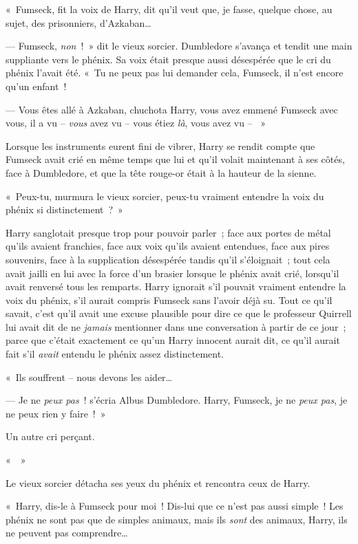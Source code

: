 «~Fumseck, fit la voix de Harry, dit qu'il veut que, je fasse, quelque chose, au sujet, des prisonniers, d'Azkaban…

--- Fumseck, \emph{non}~!~» dit le vieux sorcier. Dumbledore s'avança et tendit une main suppliante vers le phénix. Sa voix était presque aussi désespérée que le cri du phénix l'avait été. «~Tu ne peux pas lui demander cela, Fumseck, il n'est encore qu'un enfant~!

--- Vous êtes allé à Azkaban, chuchota Harry, vous avez emmené Fumseck avec vous, il a vu -- \emph{vous} avez vu -- vous étiez \emph{là}, vous avez vu -- ~»

Lorsque les instruments eurent fini de vibrer, Harry se rendit compte que Fumseck avait crié en même temps que lui et qu'il volait maintenant à ses côtés, face à Dumbledore, et que la tête rouge-or était à la hauteur de la sienne.

«~Peux-tu, murmura le vieux sorcier, peux-tu vraiment entendre la voix du phénix si distinctement~?~»

Harry sanglotait presque trop pour pouvoir parler~; face aux portes de métal qu'ils avaient franchies, face aux voix qu'ils avaient entendues, face aux pires souvenirs, face à la supplication désespérée tandis qu'il s'éloignait~; tout cela avait jailli en lui avec la force d'un brasier lorsque le phénix avait crié, lorsqu'il avait renversé tous les remparts. Harry ignorait s'il pouvait vraiment entendre la voix du phénix, s'il aurait compris Fumseck sans l'avoir déjà su. Tout ce qu'il savait, c'est qu'il avait une excuse plausible pour dire ce que le professeur Quirrell lui avait dit de ne \emph{jamais} mentionner dans une conversation à partir de ce jour~; parce que c'était exactement ce qu'un Harry innocent aurait dit, ce qu'il aurait fait s'il \emph{avait} entendu le phénix assez distinctement.

«~Ils souffrent -- nous devons les aider…

--- Je ne \emph{peux pas}~! s'écria Albus Dumbledore. Harry, Fumseck, je ne \emph{peux pas}, je ne peux rien y faire~!~»

Un autre cri perçant.

«~~»

Le vieux sorcier détacha ses yeux du phénix et rencontra ceux de Harry.

«~Harry, dis-le à Fumseck pour moi~! Dis-lui que ce n'est pas aussi simple~! Les phénix ne sont pas que de simples animaux, mais ils \emph{sont} des animaux, Harry, ils ne peuvent pas comprendre…

